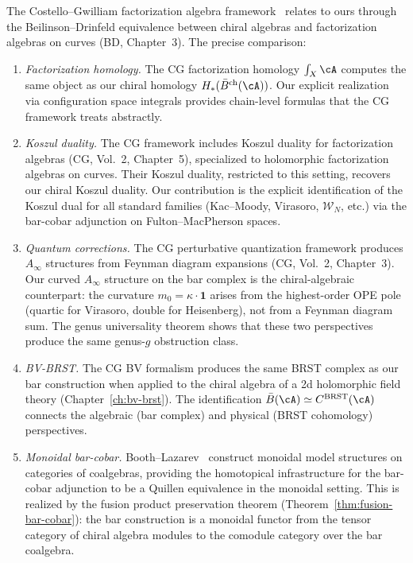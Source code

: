\begin{remark}\label{rem:cg-comparison}
The Costello--Gwilliam factorization algebra framework~\cite{CG17}
relates to ours through the Beilinson--Drinfeld equivalence between
chiral algebras and factorization algebras on curves (BD, Chapter~3).
The precise comparison:
\begin{enumerate}[label=(\roman*)]
\item \emph{Factorization homology.}
  The CG factorization homology $\int_X \cA$ computes the same object
  as our chiral homology $H_*(\bar{B}^{\mathrm{ch}}(\cA))$.  Our explicit
  realization via configuration space integrals provides chain-level
  formulas that the CG framework treats abstractly.
\item \emph{Koszul duality.}
  The CG framework includes Koszul duality for factorization algebras
  (CG, Vol.~2, Chapter~5), specialized to holomorphic factorization
  algebras on curves.  Their Koszul duality, restricted to this setting,
  recovers our chiral Koszul duality.  Our contribution is the explicit
  identification of the Koszul dual for all standard families
  (Kac--Moody, Virasoro, $\mathcal{W}_N$, etc.) via the bar-cobar
  adjunction on Fulton--MacPherson spaces.
\item \emph{Quantum corrections.}
  The CG perturbative quantization framework produces $A_\infty$
  structures from Feynman diagram expansions (CG, Vol.~2, Chapter~3).
  Our curved $A_\infty$ structure on the bar complex is the
  chiral-algebraic counterpart: the curvature $m_0 = \kappa \cdot
  \mathbf{1}$ arises from the highest-order OPE pole (quartic for
  Virasoro, double for Heisenberg), not from a Feynman diagram sum.
  The genus universality theorem shows that these two perspectives
  produce the same genus-$g$ obstruction class.
\item \emph{BV-BRST.}
  The CG BV formalism produces the same BRST complex as our bar
  construction when applied to the chiral algebra of a 2d holomorphic
  field theory (Chapter~\ref{ch:bv-brst}).  The identification
  $\bar{B}(\cA) \simeq C^{\mathrm{BRST}}(\cA)$ connects the
  algebraic (bar complex) and physical (BRST cohomology) perspectives.
\item \emph{Monoidal bar-cobar.}
  Booth--Lazarev~\cite{BL24} construct monoidal model structures on
  categories of coalgebras, providing the homotopical infrastructure
  for the bar-cobar adjunction to be a Quillen equivalence in the
  monoidal setting.  This is realized by the fusion product preservation theorem
  (Theorem~\ref{thm:fusion-bar-cobar}): the bar construction
  is a monoidal functor from the tensor category of chiral
  algebra modules to the comodule category over the bar coalgebra.
\end{enumerate}
\end{remark}


